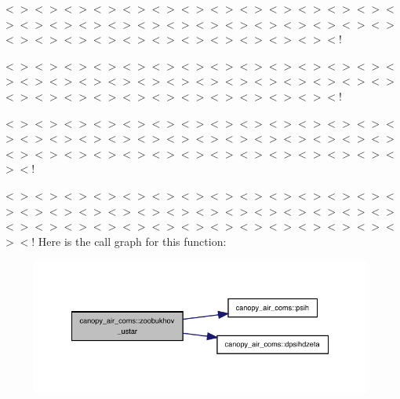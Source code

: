 $<$$>$$<$$>$$<$$>$$<$$>$$<$$>$$<$$>$$<$$>$$<$$>$$<$$>$$<$$>$$<$$>$$<$$>$$<$$>$$<$$>$$<$$>$$<$$>$$<$$>$$<$$>$$<$$>$$<$$>$$<$$>$$<$$>$$<$$>$$<$$>$$<$$>$$<$$>$$<$$>$$<$$>$$<$$>$$<$$>$$<$$>$$<$$>$$<$$>$$<$$>$$<$$>$$<$$>$$<$$>$$<$$>$$<$!

$<$$>$$<$$>$$<$$>$$<$$>$$<$$>$$<$$>$$<$$>$$<$$>$$<$$>$$<$$>$$<$$>$$<$$>$$<$$>$$<$$>$$<$$>$$<$$>$$<$$>$$<$$>$$<$$>$$<$$>$$<$$>$$<$$>$$<$$>$$<$$>$$<$$>$$<$$>$$<$$>$$<$$>$$<$$>$$<$$>$$<$$>$$<$$>$$<$$>$$<$$>$$<$$>$$<$$>$$<$$>$$<$$>$$<$!

$<$$>$$<$$>$$<$$>$$<$$>$$<$$>$$<$$>$$<$$>$$<$$>$$<$$>$$<$$>$$<$$>$$<$$>$$<$$>$$<$$>$$<$$>$$<$$>$$<$$>$$<$$>$$<$$>$$<$$>$$<$$>$$<$$>$$<$$>$$<$$>$$<$$>$$<$$>$$<$$>$$<$$>$$<$$>$$<$$>$$<$$>$$<$$>$$<$$>$$<$$>$$<$$>$$<$$>$$<$$>$$<$$>$$<$$>$$<$$>$$<$$>$$<$!

$<$$>$$<$$>$$<$$>$$<$$>$$<$$>$$<$$>$$<$$>$$<$$>$$<$$>$$<$$>$$<$$>$$<$$>$$<$$>$$<$$>$$<$$>$$<$$>$$<$$>$$<$$>$$<$$>$$<$$>$$<$$>$$<$$>$$<$$>$$<$$>$$<$$>$$<$$>$$<$$>$$<$$>$$<$$>$$<$$>$$<$$>$$<$$>$$<$$>$$<$$>$$<$$>$$<$$>$$<$$>$$<$$>$$<$$>$$<$$>$$<$$>$$<$! Here is the call graph for this function\+:
\nopagebreak
\begin{figure}[H]
\begin{center}
\leavevmode
\includegraphics[width=348pt]{namespacecanopy__air__coms_a5251266695c581c8f4058d98f6c86200_cgraph}
\end{center}
\end{figure}
\mbox{\label{namespacecanopy__air__coms_a6ef582f46fded1355973730e6a2289f2}} 
